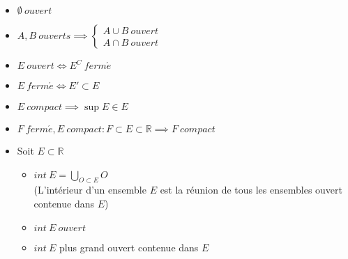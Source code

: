 	\begin{myprop}
		\begin{itemize}
			\item $\emptyset~ouvert$
			\item $A,B ~ ouverts\implies\begin{cases}
			A\cup B~ouvert\\
			A\cap B ~ ouvert
			\end{cases}$
			\item $E~ouvert\Longleftrightarrow E^C~ferm\acute{e}$
			\item $E~ferm\acute{e}\Longleftrightarrow E'\subset E$
			\item $E~compact\implies\sup E\in E$
			\item $F~ferm\acute{e},E~compact : F\subset E\subset\mathbb{R}\implies F~compact$
			\item Soit $E\subset\mathbb{R}$\begin{itemize}
				\item $int~E=\bigcup\limits_{O\subset E}O$ \\
				(L'intérieur d'un ensemble $E$ est la réunion de tous les ensembles ouvert contenue dans $E$)
				\item $int~E~ouvert$
				\item $int~E$ plus grand ouvert contenue dans $E$
			\end{itemize}
		\end{itemize}
	\end{myprop}
